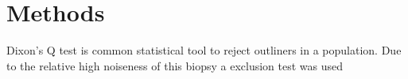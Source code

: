 \chapter{Methods}

Dixon's Q test is common statistical tool to reject outliners in a population. Due to the relative high noiseness of this biopsy a  exclusion test was used 